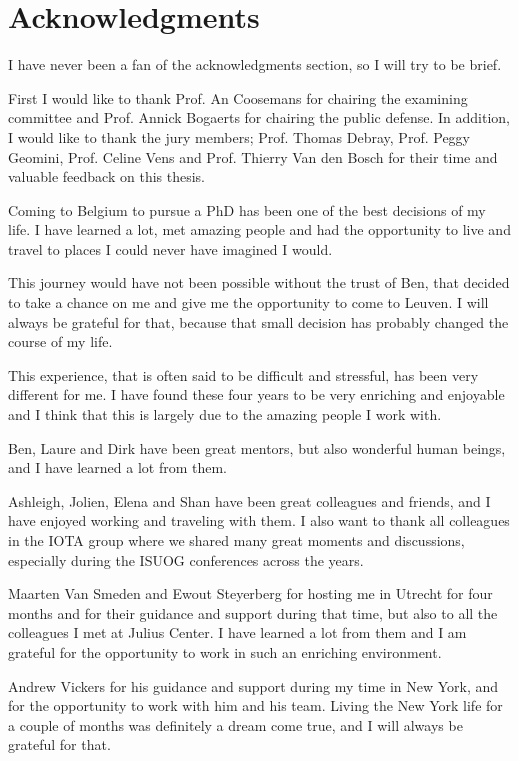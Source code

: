 \chapter*{Acknowledgments}

I have never been a fan of the acknowledgments section, so I will try to be brief.

First I would like to thank Prof. An Coosemans for chairing the examining committee and Prof. Annick Bogaerts for chairing the public defense. In addition, I would like to thank the jury members; Prof. Thomas Debray, Prof. Peggy Geomini, Prof. Celine Vens and Prof. Thierry Van den Bosch for their time and valuable feedback on this thesis.

Coming to Belgium to pursue a PhD has been one of the best decisions of my life. I have learned a lot, met amazing people and had the opportunity to live and travel to places I could never have imagined I would. 

This journey would have not been possible without the trust of Ben, that decided to take a chance on me and give me the opportunity to come to Leuven. I will always be grateful for that, because that small decision has probably changed the course of my life. 

This experience, that is often said to be difficult and stressful, has been very different for me. I have found these four years to be very enriching and enjoyable and I think that this is largely due to the amazing people I work with. 

Ben, Laure and Dirk have been great mentors, but also wonderful human beings, and I have learned a lot from them. 

Ashleigh, Jolien, Elena and Shan have been great colleagues and friends, and I have enjoyed working and traveling with them. I also want to thank all colleagues in the IOTA group where we shared many great moments and discussions, especially during the ISUOG conferences across the years. 

Maarten Van Smeden and Ewout Steyerberg for hosting me in Utrecht for four months and for their guidance and support during that time, but also to all the colleagues I met at Julius Center. I have learned a lot from them and I am grateful for the opportunity to work in such an enriching environment.

Andrew Vickers for his guidance and support during my time in New York, and for the opportunity to work with him and his team. Living the New York life for a couple of months was definitely a dream come true, and I will always be grateful for that.

